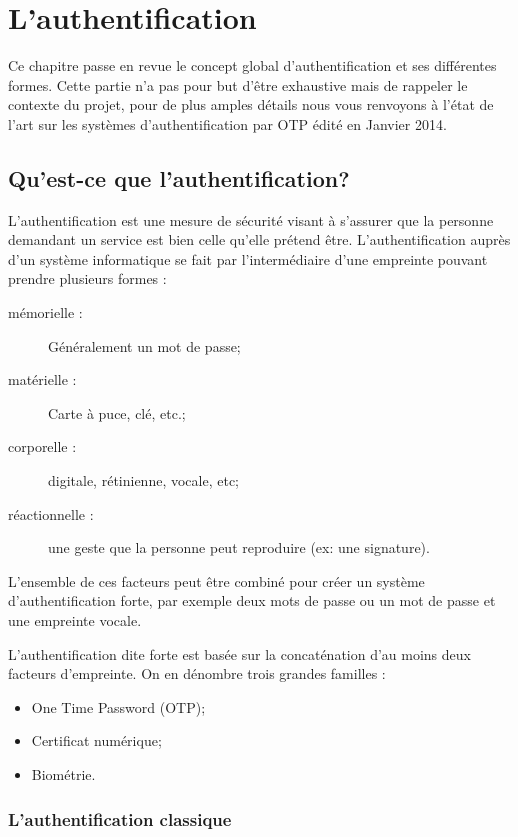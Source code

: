 \chapter{L'authentification}

	Ce chapitre passe en revue le concept global d'authentification et ses 
	différentes formes. Cette partie n'a pas pour but d'être exhaustive mais de 
	rappeler le contexte du projet, pour de plus amples détails nous vous 
	renvoyons à l'état de l'art sur les systèmes d'authentification par OTP édité 
	en Janvier 2014.

\section{Qu'est-ce que l'authentification?}

	L'authentification est une mesure de sécurité visant à s'assurer que la 
	personne demandant un service est bien celle qu'elle prétend être. 
	L'authentification auprès d'un système informatique se fait par 
	l'intermédiaire d'une empreinte pouvant prendre plusieurs formes :
	
	\begin{description}
		\item[mémorielle :] Généralement un mot de passe;
		\item[matérielle :] Carte à puce, clé, etc.;
		\item[corporelle :] digitale, rétinienne, vocale, etc;
		\item[réactionnelle :] une geste que la personne peut reproduire (ex: une 
		signature).
	\end{description}

	L'ensemble de ces facteurs peut être combiné pour créer un système 
	d'authentification forte, par exemple deux mots de passe ou un mot de passe et
	une empreinte vocale.
	
	L'authentification dite forte est basée sur la concaténation d'au moins deux 
	facteurs d'empreinte. On en dénombre trois grandes familles :
	
	\begin{itemize}
		\item One Time Password (OTP);
		\item Certificat numérique;
		\item Biométrie.
	\end{itemize}

\subsection{L'authentification classique}
	
